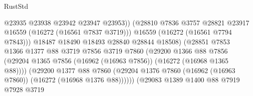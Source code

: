 \begin{lexlean}{RustStd}
\begin{coremodule}
                                            @23935
                                            @23938
                                            @23942
                                            @23947
                                            @23953))
                                        (@28810
                                          @7836
                                          @3757
                                          @28821
                                          @23917
                                          @16559
                                          (@16272 (@16561 @7837 @3719)))
                                        @16559
                                        (@16272 (@16561 @7794 @7843)))
                                      @18487
                                      @18490
                                      @18493
                                      @28840
                                      @28844
                                      @18508)
                                    (@28851
                                      @7853
                                      @1366
                                      @1377
                                      @88
                                      @3719
                                      @7856
                                      @3719
                                      @7860
                                      (@29200
                                        @1366
                                        @88
                                        @7856
                                        (@29204
                                          @1365
                                          @7856
                                          (@16962 (@16963 @7856))
                                          (@16272 (@16968 @1365 @88))))
                                      (@29200
                                        @1377
                                        @88
                                        @7860
                                        (@29204
                                          @1376
                                          @7860
                                          (@16962 (@16963 @7860))
                                          (@16272 (@16968 @1376 @88))))))
                                  (@29083
                                    @1389
                                    @1400
                                    @88
                                    @7919
                                    @7928
                                    @3719

\end{coremodule}
\end{lexlean}
